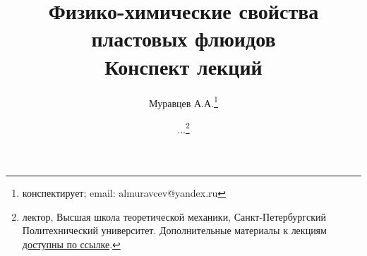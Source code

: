 \documentclass[a4paper,12pt]{article}
\begin{document}
	\tableofcontents
	\title{Физико-химические свойства пластовых флюидов\\Конспект лекций}
	\author{Муравцев А.А.\thanks{конспектирует; email: almuravcev@yandex.ru}
	\and
	...\thanks{лектор, Высшая школа теоретической механики, Санкт-Петербургский Политехнический университет. Дополнительные материалы к лекциям \href{https://csspbstu-my.sharepoint.com/:f:/g/personal/muravtsev_aa_edu_spbstu_ru/Epiacj6WFMBHqIF6E3YQgCMB7yi5NAA1ycqFLqrTZMhJ4w?e=i2agP0}{доступны по ссылке}.}}
	\maketitle
	
	\newpage
\end{document}
